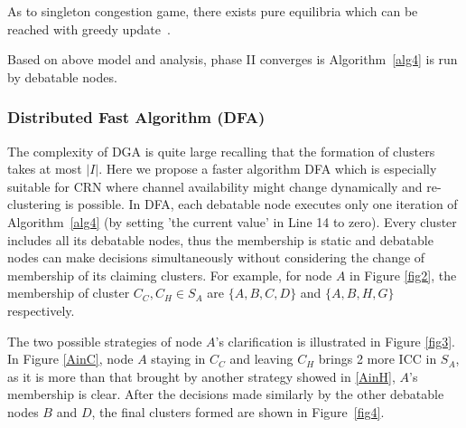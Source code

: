As to singleton congestion game, there exists pure equilibria which can be reached with greedy update~\cite{Ackermann06purenash}.


Based on above model and analysis, phase II converges is Algorithm~\ref{alg4} is run by debatable nodes. 

\subsubsection*{Distributed Fast Algorithm (DFA)}
The complexity of DGA is quite large recalling that the formation of clusters takes at most $|I|$. Here we propose a faster algorithm DFA which is especially suitable for CRN where channel availability might change dynamically and re-clustering is possible. %
In DFA, each debatable node executes only one iteration of Algorithm~\ref{alg4} (by setting 'the current value' in Line 14 to zero). Every cluster includes all its debatable nodes, thus the membership is static and debatable nodes can make decisions simultaneously without considering the change of membership of its claiming clusters. For example, for node $A$ in Figure \ref{fig2}, the membership of cluster $C_C, C_H\in S_A$ are $\{A,B,C,D\}$ and $\{A,B,H,G\}$ respectively. 

The two possible strategies of node $A$'s clarification is illustrated in Figure \ref{fig3}. In Figure \ref{AinC}, node $A$ staying in $C_C$ and leaving $C_H$ brings 2 more ICC in $S_A$, as it is more than that brought by another strategy showed in \ref{AinH}, $A$'s membership is clear. After the decisions made similarly by the other debatable nodes $B$ and $D$, the final clusters formed are shown in Figure~\ref{fig4}.

